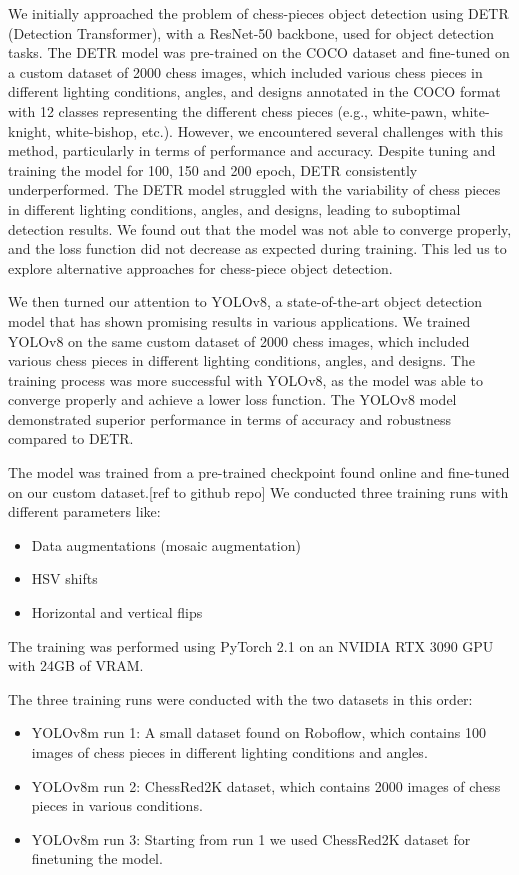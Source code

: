 \usepackage{graphicx}

We initially approached the problem of chess-pieces object detection using DETR (Detection Transformer), with a ResNet-50 backbone, used for object detection tasks.
The DETR model was pre-trained on the COCO dataset and fine-tuned on a custom dataset of 2000 chess images, which included various chess pieces in different lighting conditions,
 angles, and designs annotated in the COCO format with 12 classes representing the different chess pieces (e.g., white-pawn, white-knight, white-bishop, etc.).
However, we encountered several challenges with this method, particularly in terms of performance and accuracy.
Despite tuning and training the model for 100, 150 and 200 epoch, DETR consistently underperformed.
The DETR model struggled with the variability of chess pieces in different lighting conditions, angles, and designs, leading to suboptimal detection results.
We found out that the model was not able to converge properly, and the loss function did not decrease as expected during training.
This led us to explore alternative approaches for chess-piece object detection.

We then turned our attention to YOLOv8, a state-of-the-art object detection model that has shown promising results in various applications.
We trained YOLOv8 on the same custom dataset of 2000 chess images, which included various chess pieces in different lighting conditions, angles, and designs.
The training process was more successful with YOLOv8, as the model was able to converge properly and achieve a lower loss function.
The YOLOv8 model demonstrated superior performance in terms of accuracy and robustness compared to DETR.

The model was trained from a pre-trained checkpoint found online and fine-tuned on our custom dataset.[ref to github repo]
We conducted three training runs with different parameters like:
\begin{itemize}
    \item Data augmentations (mosaic augmentation)
    \item HSV shifts
    \item Horizontal and vertical flips
\end{itemize}
The training was performed using PyTorch 2.1 on an NVIDIA RTX 3090 GPU with 24GB of VRAM.

The three training runs were conducted with the two datasets in this order:
\begin{itemize}
    \item YOLOv8m run 1: A small dataset found on Roboflow, which contains 100 images of chess pieces in different lighting conditions and angles.
    \item YOLOv8m run 2: ChessRed2K dataset, which contains 2000 images of chess pieces in various conditions.
    \item YOLOv8m run 3: Starting from run 1 we used ChessRed2K dataset for finetuning the model.
\end{itemize}

